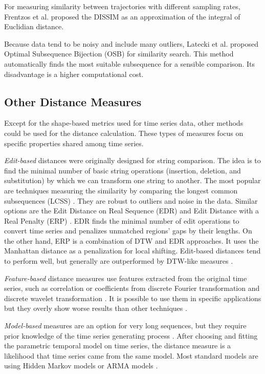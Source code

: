 For measuring similarity between trajectories with different sampling rates, Frentzos et al. \cite{met:dissim} proposed the DISSIM as an approximation of the integral of Euclidian distance. 

Because data tend to be noisy and include many outliers, Latecki et al. \cite{met:osb} proposed Optimal Subsequence Bijection (OSB) for similarity search. This method automatically finds the most suitable subsequence for a sensible comparison. Its disadvantage is a higher computational cost.

\subsection{Other Distance Measures}
Except for the shape-based metrics used for time series data, other methods could be used for the distance calculation. These types of measures focus on specific properties shared among time series.
 
\textit{Edit-based} distances were originally designed for string comparison. The idea is to find the minimal number of basic string operations (insertion, deletion, and substitution) by which we can transform one string to another.  The most popular are techniques measuring the similarity by comparing the longest common subsequences (LCSS) \cite{met:LCSS0, met:LCSS1, met:swale}. They are robust to outliers and noise in the data. Similar options are the Edit Distance on Real Sequence (EDR) \cite{met:edr} and Edit Distance with a Real Penalty (ERP) \cite{met:erp}. EDR finds the minimal number of edit operations to convert time series and penalizes unmatched regions' gaps by their lengths. On the other hand, ERP is a combination of DTW and EDR approaches. It uses the Manhattan distance as a penalization for local shifting. Edit-based distances tend to perform well, but generally are outperformed by DTW-like measures \cite{met:dtw-best-0, met:dtw-best-1}. 

\textit{Feature-based} distance measures use features extracted from the original time series, such as correlation \cite{met:coss-col} or coefficients from discrete Fourier transformation and discrete wavelet transformation \cite{met:dft-dwt}. It is possible to use them in specific applications but they overly show worse results than other techniques \cite{met:comparison-new}.

\textit{Model-based} measures are an option for very long sequences, but they require prior knowledge of the time series generating process \cite{met:classification}. After choosing and fitting the parametric temporal model on time series, the distance measure is a likelihood that time series came from the same model. Most standard models are using Hidden Markov models or ARMA models \cite{met:hmm}.

